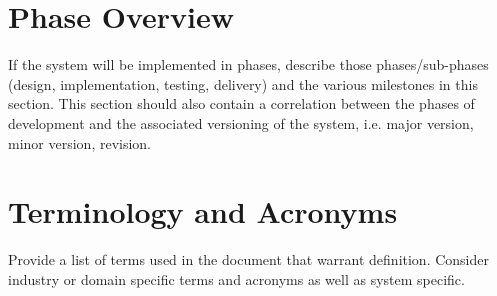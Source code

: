 \section{Phase  Overview}


If the system will be implemented in phases, describe those phases/sub-phases (design, 
implementation, testing, delivery) and the various milestones in this section. 
 This section should also contain a correlation between the phases of development 
and the associated versioning of the system, i.e. major version, minor version, 
revision. 

\section{Terminology and Acronyms}
Provide a list of terms used in the document that warrant definition.  Consider 
industry or domain specific terms and acronyms as well as system specific. 
